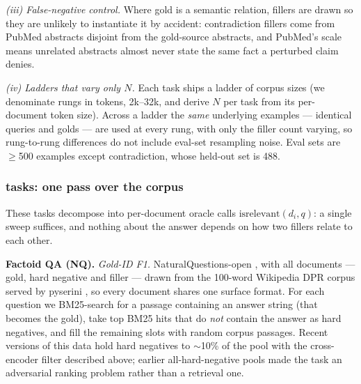 \emph{(iii) False-negative control.} Where gold is a semantic relation, fillers are drawn so they are unlikely to instantiate it by accident: contradiction fillers come from PubMed abstracts disjoint from the gold-source abstracts, and PubMed's scale means unrelated abstracts almost never state the same fact a perturbed claim denies.

\emph{(iv) Ladders that vary only $N$.} Each task ships a ladder of corpus sizes (we denominate rungs in tokens, 2k--32k, and derive $N$ per task from its per-document token size). Across a ladder the \emph{same} underlying examples --- identical queries and golds --- are used at every rung, with only the filler count varying, so rung-to-rung differences do not include eval-set resampling noise. Eval sets are $\geq$500 examples except contradiction, whose held-out set is 488.


\subsubsection{ tasks: one pass over the corpus}

These tasks decompose into per-document oracle calls $\mathrm{isrelevant}(d_i, q)$: a single sweep suffices, and nothing about the answer depends on how two fillers relate to each other.

\textbf{Factoid QA (NQ).} \emph{Gold-ID F1.} NaturalQuestions-open \citep{izacardNQ}, with all documents --- gold, hard negative and filler --- drawn from the 100-word Wikipedia DPR corpus \citep{Karpukhin2020DensePR} served by pyserini \citep{Lin2021PyseriniAP}, so every document shares one surface format. For each question we BM25-search \citep{Robertson1976RelevanceWOBM25} for a passage containing an answer string (that becomes the gold), take top BM25 hits that do \emph{not} contain the answer as hard negatives, and fill the remaining slots with random corpus passages. Recent versions of this data hold hard negatives to $\sim$10\% of the pool with the cross-encoder filter described above; earlier all-hard-negative pools made the task an adversarial ranking problem rather than a retrieval one.

